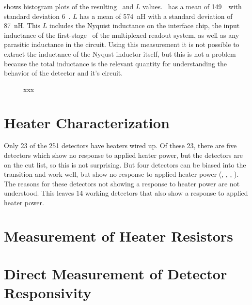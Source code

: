  shows histogram plots of the resulting \Rsh\ and $L$ values.
\Rsh\ has a mean of 149~\uOhm\ with standard deviation 6~\uOhm.
$L$ has a mean of 574~nH with a standard deviation of 87~nH.
This $L$ includes the Nyquist inductance on the interface chip, the input inductance of the first-stage \SQUID\ of the multiplexed readout system, as well as any parasitic inductance in the circuit.
Using this measurement it is not possible to extract the inductance of the Nyqust inductor itself, but this is not a problem because the total inductance is the relevant  quantity for understanding the behavior of the detector and it's circuit.

\begin{figure*}
\centering

\caption{xxx}
\label{fig:rsh-hist}
\end{figure*}

\section{Heater Characterization}

Only 23 of the 251 detectors have heaters wired up.
Of these 23, there are five detectors which show no response to applied heater power, but the detectors are on the cut  list, so this is not surprising.
But four detectors can be biased into the transition and work well, but show no response to applied heater power (, , , ).
The reasons for these detectors not showing a response to heater power are not understood.
This leaves 14 working detectors that also show a response to applied heater power.


\section{Measurement of Heater Resistors}

\section{Direct Measurement of Detector Responsivity}


